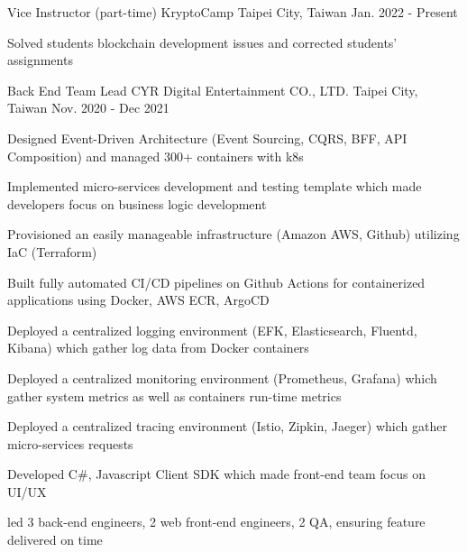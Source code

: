 
\begin{cventries}
  \cventry
    {Vice Instructor (part-time)} %
    {KryptoCamp} %
    {Taipei City, Taiwan} %
    {Jan. 2022 - Present} %
    {
      \begin{cvitems} %
        \item {Solved students blockchain development issues and corrected students' assignments}
      \end{cvitems}
    }

  \cventry
    {Back End Team Lead} %
    {CYR Digital Entertainment CO., LTD.} %
    {Taipei City, Taiwan} %
    {Nov. 2020 - Dec 2021} %
    {
      \begin{cvitems} %
        \item {Designed Event-Driven Architecture (Event Sourcing, CQRS, BFF, API Composition) and managed 300+ containers with k8s}
        \item {Implemented micro-services development and testing template which made developers focus on business logic development}
        \item {Provisioned an easily manageable infrastructure (Amazon AWS, Github) utilizing IaC (Terraform)}
        \item {Built fully automated CI/CD pipelines on Github Actions for containerized applications using Docker, AWS ECR, ArgoCD}
        \item {Deployed a centralized logging environment (EFK, Elasticsearch, Fluentd, Kibana) which gather log data from Docker containers}
        \item {Deployed a centralized monitoring environment (Prometheus, Grafana) which gather system metrics as well as containers run-time metrics}
        \item {Deployed a centralized tracing environment (Istio, Zipkin, Jaeger) which gather micro-services requests}
        \item {Developed C\#, Javascript Client SDK which made front-end team focus on UI/UX}
        \item {led 3 back-end engineers, 2 web front-end engineers, 2 QA, ensuring feature delivered on time}
      \end{cvitems}
    }
    

\end{cventries}
